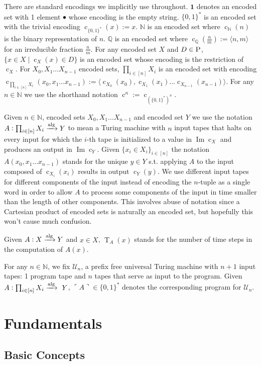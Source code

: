 \documentclass{article}
\numberwithin{equation}{section}
\theoremstyle{definition}
\theoremstyle{plain}
\newcommand{\Bool}{\{0,1\}}
\newcommand{\Words}{{\Bool^*}}
\DeclareMathOperator{\Img}{Im}
\DeclareMathOperator{\T}{T}
\DeclareMathOperator{\En}{c}
\newcommand{\Nats}{\mathbb{N}}
\newcommand{\Rats}{\mathbb{Q}}
\newcommand{\Chev}[1]{\langle #1 \rangle}
\newcommand{\Quote}[1]{\ulcorner #1 \urcorner}
\newcommand{\Alg}{\xrightarrow{\textnormal{alg}}}
\begin{document}
There are standard encodings we implicitly use throughout. $\bm{1}$ denotes an encoded set with 1 element $\bullet$ whose encoding is the empty string. $\Words$ is an encoded set with the trivial encoding ${\En_\Words(x):=x}$. $\Nats$ is an encoded set where $\En_\Nats(n)$ is the binary representation of $n$. $\Rats$ is an encoded set where ${\En_\Rats(\frac{n}{m}):=\Chev{n,m}}$ for an irreducible fraction $\frac{n}{m}$. For any encoded set $X$ and $D \in \textsc{P}$, $\{x \in X \mid \En_X(x) \in D\}$ is an encoded set whose encoding is the restriction of $\En_X$. For $X_0,X_1 \ldots X_{n-1}$ encoded sets, $\prod_{i \in [n]} X_i$ is an encoded set with encoding $\En_{\prod_{i \in [n]} X_i}(x_0,x_1 \ldots x_{n-1}):=\Chev{\En_{X_0}(x_0),\En_{X_1}(x_1) \ldots \En_{X_{n-1}}(x_{n-1})}$. For any $n \in \Nats$ we use the shorthand notation $\En^n:=\En_{(\Words)^n}$.

Given $n \in \Nats$, encoded sets $X_0, X_1 \ldots X_{n-1}$ and encoded set $Y$ we use the notation ${A: \prod_{i \in [n]} X_i \Alg Y}$ to mean a Turing machine with $n$ input tapes that halts on every input for which the $i$-th tape is initialized to a value in $\Img \En_X$ and produces an output in $\Img \En_Y$. Given $\{x_i \in X_i\}_{i \in [n]}$ the notation $A(x_0, x_1 \ldots x_{n-1})$ stands for the unique $y \in Y$ s.t. applying $A$ to the input composed of $\En_{X_i}(x_i)$ results in output $\En_Y(y)$. We use different input tapes for different components of the input instead of encoding the $n$-tuple as a single word in order to allow $A$ to process some components of the input in time smaller than the length of other components. This involves abuse of notation since a Cartesian product of encoded sets is naturally an encoded set, but hopefully this won't cause much confusion.

Given $A: X \Alg Y$ and $x \in X$, $\T_A(x)$ stands for the number of time steps in the computation of $A(x)$.

For any $n \in \Nats$, we fix $\mathcal{U}_n$, a prefix free universal Turing machine with $n+1$ input tapes: 1 program tape and $n$ tapes that serve as input to the program. Given $A: \prod_{i \in [n]} X_i \Alg\ Y$, $\Quote{A} \in \Words$ denotes the corresponding program for $\mathcal{U}_n$.

\section{Fundamentals}
\label{sec:fundamentals}

\subsection{Basic Concepts}
\end{document}
